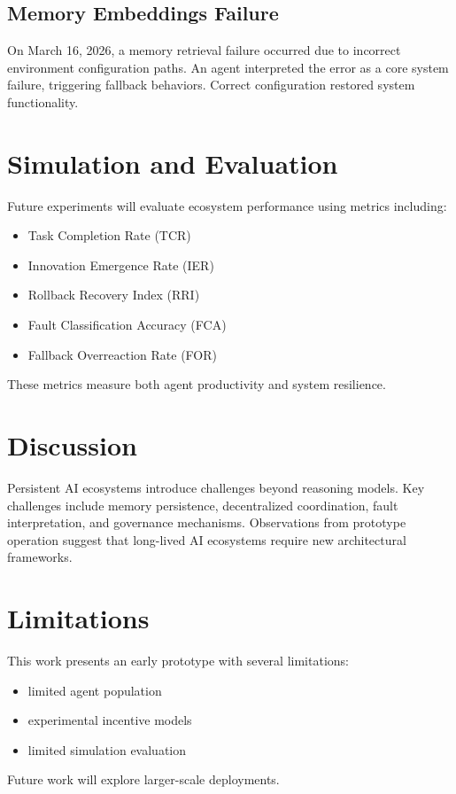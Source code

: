 \documentclass[11pt]{article}
\begin{document}
\subsection{Memory Embeddings Failure}
On March 16, 2026, a memory retrieval failure occurred due to incorrect environment configuration paths. An agent interpreted the error as a core system failure, triggering fallback behaviors. Correct configuration restored system functionality.

\section{Simulation and Evaluation}
Future experiments will evaluate ecosystem performance using metrics including:
\begin{itemize}[leftmargin=1.5em]
\item Task Completion Rate (TCR)
\item Innovation Emergence Rate (IER)
\item Rollback Recovery Index (RRI)
\item Fault Classification Accuracy (FCA)
\item Fallback Overreaction Rate (FOR)
\end{itemize}
These metrics measure both agent productivity and system resilience.

\section{Discussion}
Persistent AI ecosystems introduce challenges beyond reasoning models. Key challenges include memory persistence, decentralized coordination, fault interpretation, and governance mechanisms. Observations from prototype operation suggest that long-lived AI ecosystems require new architectural frameworks.

\section{Limitations}
This work presents an early prototype with several limitations:
\begin{itemize}[leftmargin=1.5em]
\item limited agent population
\item experimental incentive models
\item limited simulation evaluation
\end{itemize}
Future work will explore larger-scale deployments.
\end{document}
